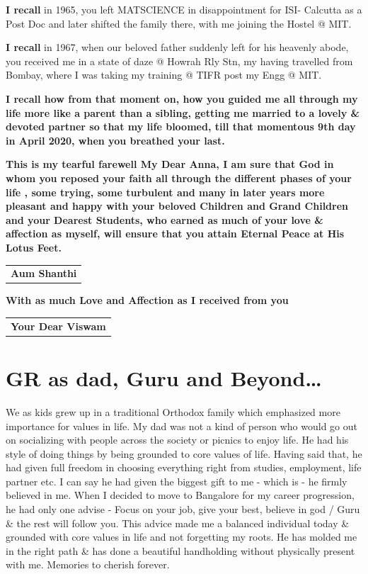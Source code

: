 \textbf{I recall} in 1965, you left MATSCIENCE in disappointment for ISI- Calcutta as a Post Doc and later shifted the family there, with me joining the Hostel @ MIT.

\textbf{I recall} in 1967, when our beloved father suddenly left for his heavenly abode, you received me in a state of daze @ Howrah Rly Stn, my having travelled from Bombay, where I was taking my training @ TIFR post my Engg @ MIT.

\textbf{I recall how from that moment on, how you guided me all through my life more like a parent than a sibling, getting me married to a lovely \& devoted partner so that my life bloomed, till that momentous 9th day in April 2020, when you breathed your last.}

\textbf{This is my tearful farewell My Dear Anna, I am sure that God in whom you reposed your faith all through the different phases of your life , some trying, some turbulent and many in later years more pleasant and happy with your beloved Children and Grand Children and your Dearest Students, who earned as much of your love \& affection as myself, will ensure that you attain Eternal Peace at His Lotus Feet. } 

\bigskip

\begin{flushright}
\begin{tabular}{c}
\multicolumn{1}{p{3cm}}{\textbf{Aum Shanthi}}
\end{tabular}
\end{flushright}

\noindent \textbf{With as much Love and Affection as I received from you}

\bigskip
\begin{flushright}
\begin{tabular}{c}
\multicolumn{1}{p{3.5cm}}{\textbf{Your Dear Viswam}}
\end{tabular}
\end{flushright}

\newpage

\section*{GR as dad, Guru and Beyond…}

We as kids grew up in a traditional Orthodox family which emphasized more importance for values in life. My dad was not a kind of person who would go out on socializing with people across the society or picnics to enjoy life. He had his style of doing things by being grounded to core values of life. Having said that, he had given full freedom in choosing everything right from studies, employment, life partner etc. I can say he had given the biggest gift to me - which is - he firmly believed in me. When I decided to move to Bangalore for my career progression, he had only one advise - Focus on your job, give your best, believe in god / Guru \& the rest will follow you. This advice made me a balanced individual today \& grounded with core values in life and not forgetting my roots. He has molded me in the right path \& has done a beautiful handholding without physically present with me. Memories to cherish forever.

